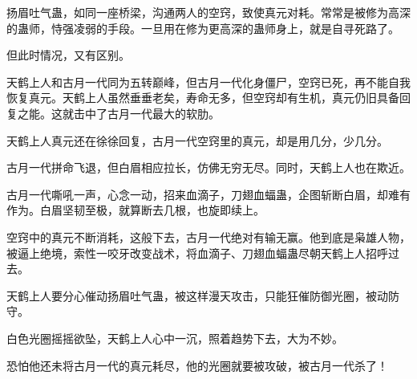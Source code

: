 \begin{this_body}
扬眉吐气蛊，如同一座桥梁，沟通两人的空窍，致使真元对耗。常常是被修为高深的蛊师，恃强凌弱的手段。一旦用在修为更高深的蛊师身上，就是自寻死路了。

但此时情况，又有区别。

天鹤上人和古月一代同为五转巅峰，但古月一代化身僵尸，空窍已死，再不能自我恢复真元。天鹤上人虽然垂垂老矣，寿命无多，但空窍却有生机，真元仍旧具备回复之能。这就击中了古月一代最大的软肋。

天鹤上人真元还在徐徐回复，古月一代空窍里的真元，却是用几分，少几分。

古月一代拼命飞退，但白眉相应拉长，仿佛无穷无尽。同时，天鹤上人也在欺近。

古月一代嘶吼一声，心念一动，招来血滴子，刀翅血蝠蛊，企图斩断白眉，却难有作为。白眉坚韧至极，就算断去几根，也旋即续上。

空窍中的真元不断消耗，这般下去，古月一代绝对有输无赢。他到底是枭雄人物，被逼上绝境，索性一咬牙改变战术，将血滴子、刀翅血蝠蛊尽朝天鹤上人招呼过去。

天鹤上人要分心催动扬眉吐气蛊，被这样漫天攻击，只能狂催防御光圈，被动防守。

白色光圈摇摇欲坠，天鹤上人心中一沉，照着趋势下去，大为不妙。

恐怕他还未将古月一代的真元耗尽，他的光圈就要被攻破，被古月一代杀了！

\end{this_body}

